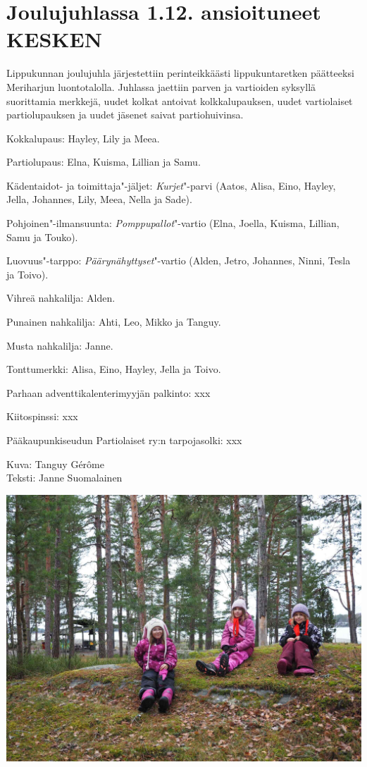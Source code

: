 \section{Joulujuhlassa 1.12. ansioituneet KESKEN}

\begin{multicols}{2}
\noindent Lippukunnan joulujuhla järjestettiin perinteikkäästi 
lippukuntaretken päätteeksi Meriharjun luontotalolla. Juhlassa jaettiin 
parven ja vartioiden syksyllä suorittamia merkkejä, uudet kolkat antoivat 
kolkkalupauksen, uudet vartiolaiset partiolupauksen ja uudet jäsenet saivat 
partiohuivinsa.

Kokkalupaus: Hayley, Lily ja Meea.

Partiolupaus: Elna, Kuisma, Lillian ja Samu.

Kädentaidot- ja toimittaja"-jäljet: \textit{Kurjet}"-parvi (Aatos, Alisa, 
Eino, Hayley, Jella, Johannes, Lily, Meea, Nella ja Sade).

Pohjoinen"-ilmansuunta: \textit{Pomppupallot}"-vartio (Elna, Joella, Kuisma, 
Lillian, Samu ja Touko).

Luovuus"-tarppo: \textit{Päärynähyttyset}"-vartio (Alden, Jetro, Johannes, 
Ninni, Tesla ja Toivo).

Vihreä nahkalilja: Alden.

Punainen nahkalilja: Ahti, Leo, Mikko ja Tanguy.

Musta nahkalilja: Janne.

Tonttumerkki: Alisa, Eino, Hayley, Jella ja Toivo.

Parhaan adventtikalenterimyyjän palkinto: xxx

Kiitospinssi: xxx

Pääkaupunkiseudun Partiolaiset ry:n tarpojasolki: xxx

\vspace*{.50cm}
{\raggedleft Kuva: Tanguy Gérôme\\
Teksti: Janne Suomalainen\par}

\end{multicols}

\vspace*{.50cm}
\noindent\includegraphics[width=\linewidth,trim={0 0.5cm 0 2cm},clip]{assets/pikkujoulu1}


